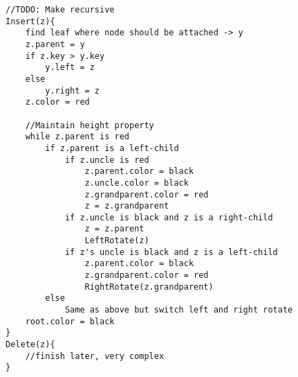 \documentclass{article}
\begin{document}
\begin{figure}[h]
\centering
{}
\end{figure}

\begin{minipage}{\linewidth}
\begin{lstlisting}[style=pseudo]
//TODO: Make recursive
Insert(z){
	find leaf where node should be attached -> y
	z.parent = y
	if z.key > y.key
		y.left = z
	else
		y.right = z
	z.color = red

	//Maintain height property
	while z.parent is red
		if z.parent is a left-child
			if z.uncle is red
				z.parent.color = black
				z.uncle.color = black
				z.grandparent.color = red
				z = z.grandparent
			if z.uncle is black and z is a right-child
				z = z.parent
				LeftRotate(z)
			if z's uncle is black and z is a left-child
				z.parent.color = black
				z.grandparent.color = red
				RightRotate(z.grandparent)
		else
			Same as above but switch left and right rotate
	root.color = black
}
Delete(z){
	//finish later, very complex
}
\end{lstlisting}
\end{minipage}




\end{document}
